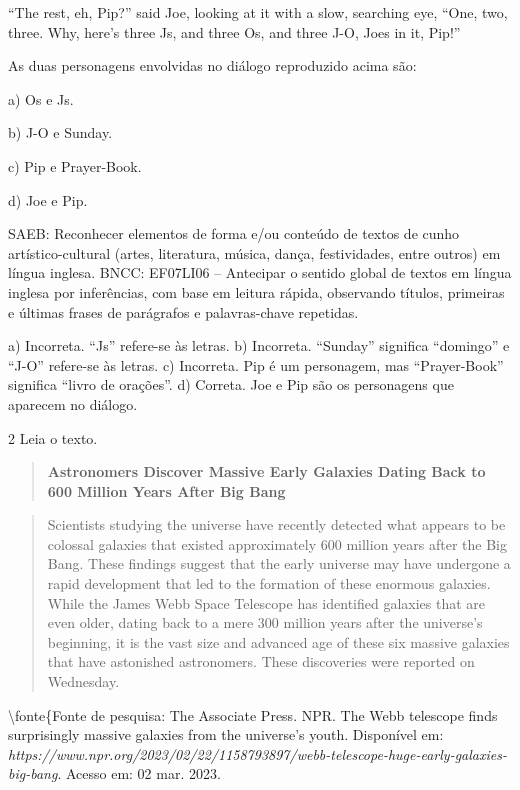 ``The rest, eh, Pip?'' said Joe, looking at it with a slow, searching
eye, ``One, two, three. Why, here's three Js, and three Os, and three
J-O, Joes in it, Pip!''


As duas personagens envolvidas no diálogo reproduzido acima são:

a) Os e Js.

b) J-O e Sunday.

c) Pip e Prayer-Book.

d) Joe e Pip.

SAEB: Reconhecer elementos de forma e/ou conteúdo de textos de cunho
artístico-cultural (artes, literatura, música, dança, festividades,
entre outros) em língua inglesa. BNCC: EF07LI06 -- Antecipar o sentido
global de textos em língua inglesa por inferências, com base em leitura
rápida, observando títulos, primeiras e últimas frases de parágrafos e
palavras-chave repetidas.

a) Incorreta. ``Js'' refere-se às letras. b) Incorreta. ``Sunday''
significa ``domingo'' e ``J-O'' refere-se às letras. c) Incorreta. Pip é
um personagem, mas ``Prayer-Book'' significa ``livro de orações''. d)
Correta. Joe e Pip são os personagens que aparecem no diálogo.

\num{2} Leia o texto.

\begin{quote}
\textbf{Astronomers Discover Massive Early Galaxies Dating Back to 600
Million Years After Big Bang}
\end{quote}

\begin{quote}
Scientists studying the universe have recently detected what appears to
be colossal galaxies that existed approximately 600 million years after
the Big Bang. These findings suggest that the early universe may have
undergone a rapid development that led to the formation of these
enormous galaxies. While the James Webb Space Telescope has identified
galaxies that are even older, dating back to a mere 300 million years
after the universe's beginning, it is the vast size and advanced age of
these six massive galaxies that have astonished astronomers. These
discoveries were reported on Wednesday.
\end{quote}

\textbackslash{}fonte\{Fonte de pesquisa: The Associate Press. NPR. The
Webb telescope finds surprisingly massive galaxies from the universe's
youth. Disponível em:
\emph{https://www.npr.org/2023/02/22/1158793897/webb-telescope-huge-early-galaxies-big-bang}.
Acesso em: 02 mar. 2023.

